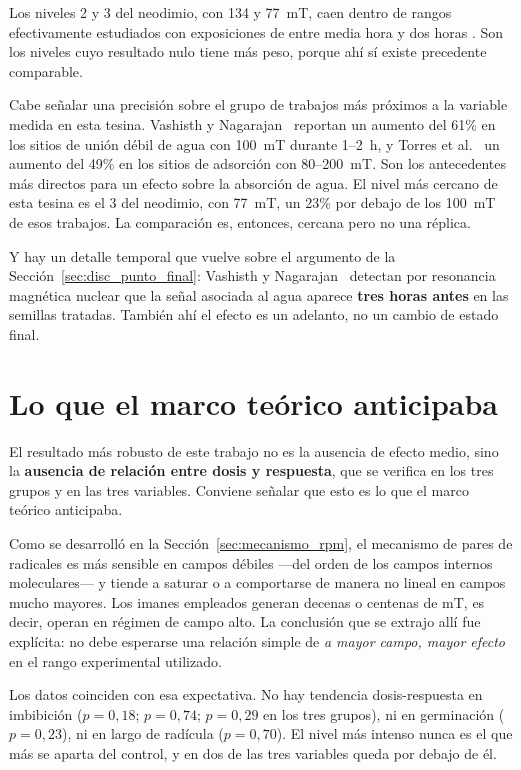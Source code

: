 Los niveles 2 y 3 del neodimio, con 134 y 77~mT, caen dentro de rangos efectivamente estudiados con exposiciones de entre media hora y dos horas \cite{shine_2017, vashisth_nagarajan_2009, vashisth_nagarajan_2010, dominguez_pacheco_2010}. Son los niveles cuyo resultado nulo tiene más peso, porque ahí sí existe precedente comparable.

Cabe señalar una precisión sobre el grupo de trabajos más próximos a la variable medida en esta tesina. Vashisth y Nagarajan~\cite{vashisth_nagarajan_2009} reportan un aumento del 61\% en los sitios de unión débil de agua con 100~mT durante 1--2~h, y Torres et al.~\cite{torres_socorro_2018} un aumento del 49\% en los sitios de adsorción con 80--200~mT. Son los antecedentes más directos para un efecto sobre la absorción de agua. El nivel más cercano de esta tesina es el 3 del neodimio, con 77~mT, un 23\% por debajo de los 100~mT de esos trabajos. La comparación es, entonces, cercana pero no una réplica.

Y hay un detalle temporal que vuelve sobre el argumento de la Sección~\ref{sec:disc_punto_final}: Vashisth y Nagarajan~\cite{vashisth_nagarajan_2010} detectan por resonancia magnética nuclear que la señal asociada al agua aparece \textbf{tres horas antes} en las semillas tratadas. También ahí el efecto es un adelanto, no un cambio de estado final.

\section{Lo que el marco teórico anticipaba}
\label{sec:disc_rpm}

El resultado más robusto de este trabajo no es la ausencia de efecto medio, sino la \textbf{ausencia de relación entre dosis y respuesta}, que se verifica en los tres grupos y en las tres variables. Conviene señalar que esto es lo que el marco teórico anticipaba.

Como se desarrolló en la Sección~\ref{sec:mecanismo_rpm}, el mecanismo de pares de radicales es más sensible en campos débiles ---del orden de los campos internos moleculares--- y tiende a saturar o a comportarse de manera no lineal en campos mucho mayores. Los imanes empleados generan decenas o centenas de mT, es decir, operan en régimen de campo alto. La conclusión que se extrajo allí fue explícita: no debe esperarse una relación simple de \emph{a mayor campo, mayor efecto} en el rango experimental utilizado.

Los datos coinciden con esa expectativa. No hay tendencia dosis-respuesta en imbibición (\(p = 0{,}18\); \(p = 0{,}74\); \(p = 0{,}29\) en los tres grupos), ni en germinación (\(p = 0{,}23\)), ni en largo de radícula (\(p = 0{,}70\)). El nivel más intenso nunca es el que más se aparta del control, y en dos de las tres variables queda por debajo de él.

